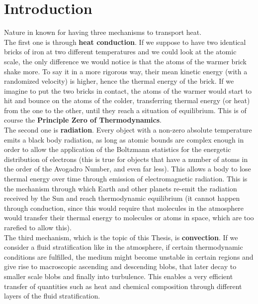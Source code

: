 

\chapter{Introduction}
Nature in known for having three mechanisms to transport heat.  \\
The first one is through \textbf{heat conduction}. If we suppose to have two identical bricks of iron at two different temperatures and we could look at the atomic scale, the only difference we would notice is that the atoms of the warmer brick shake more. To say it in a more rigorous way, their mean kinetic energy (with a randomized velocity) is higher, hence the thermal energy of the brick. If we imagine to put the two bricks in contact, the atoms of the warmer would start to hit and bounce on the atoms of the colder, transferring thermal energy (or heat) from the one to the other, until they reach a situation of equilibrium. This is of course the \textbf{Principle Zero of Thermodynamics}. \\
The second one is \textbf{radiation}. Every object with a non-zero absolute temperature emits a black body radiation, as long as atomic bounds are complex enough in order to allow the application of the Boltzmann statistics for the energetic distribution of electrons (this is true for objects that have a number of atoms in the order of the Avogadro Number, and even far less). This allows a body to lose thermal energy over time through emission of electromagnetic radiation. This is the mechanism through which Earth and other planets re-emit the radiation received by the Sun and reach thermodynamic equilibrium (it cannot happen through conduction, since this would require that molecules in the atmosphere would transfer their thermal energy to molecules or atoms in space, which are too rarefied to allow this). \\
The third mechanism, which is the topic of this Thesis, is \textbf{convection}. If we consider a fluid stratification like in the atmosphere, if certain thermodynamic conditions are fulfilled, the medium might become unstable in certain regions and give rise to macroscopic ascending and descending blobs, that later decay to smaller scale blobs and finally into turbulence. This enables a very efficient transfer of quantities such as heat and chemical composition through different layers of the fluid stratification. \\
